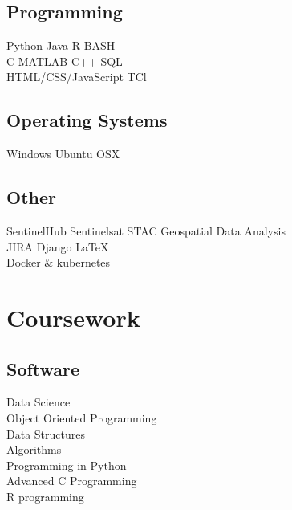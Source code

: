 \documentclass[letterpaper]{deedy-resume} %
\begin{document}
\begin{minipage}[t]{0.33\textwidth}
\subsection{Programming}

Python \textbullet{} Java \textbullet{} R \textbullet{} BASH \textbullet{} \\
C \textbullet{} MATLAB \textbullet{} C++ \textbullet{} SQL \textbullet{}\\ HTML/CSS/JavaScript \textbullet{} TCl \textbullet{}\\
\sectionspace

\subsection{Operating Systems}
Windows \textbullet{} Ubuntu \textbullet{} OSX
\sectionspace

\subsection{Other}
SentinelHub \textbullet{} Sentinelsat \textbullet{} STAC \textbullet{} Geospatial Data Analysis \textbullet{} \\ JIRA \textbullet{} Django \textbullet{} \LaTeX \textbullet{}\\ 
Docker \& kubernetes

\sectionspace %


\section{Coursework}


\subsection{Software}

Data Science \\
Object Oriented Programming \\
Data Structures \\
Algorithms \\
Programming in Python \\
Advanced C Programming \\
R programming \\


\end{minipage}
\end{document}
